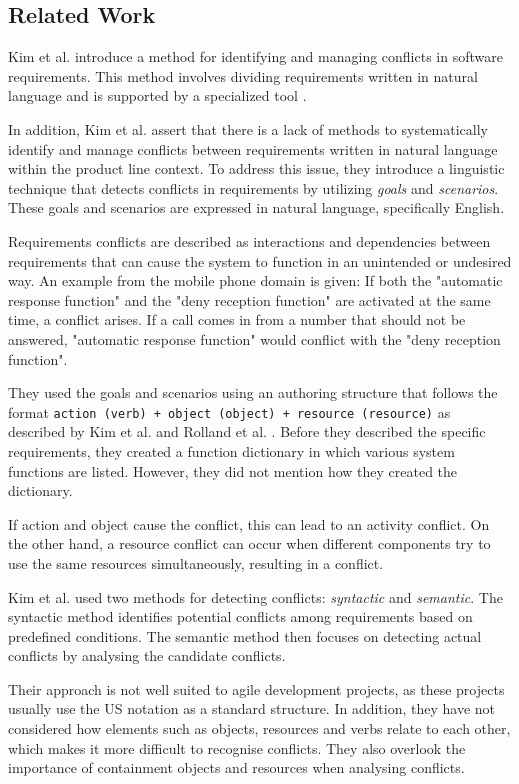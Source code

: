 \subsection{Related Work}\label{conflict_related_work}
Kim et al. introduce a method for identifying and managing conflicts in software requirements. This method involves dividing requirements written in natural language and is supported by a specialized tool \cite{kim2007managing}.

In addition, Kim et al. assert that there is a lack of methods to systematically identify and manage conflicts between requirements written in natural language within the product line context. To address this issue, they introduce a linguistic technique that detects conflicts in requirements by utilizing \textit{goals} and \textit{scenarios}. These goals and scenarios are expressed in natural language, specifically English.

Requirements conflicts are described as interactions and dependencies between requirements that can cause the system to function in an unintended or undesired way. An example from the mobile phone domain is given: If both the "automatic response function" and the "deny reception function" are activated at the same time, a conflict arises. If a call comes in from a number that should not be answered, "automatic response function" would conflict with the "deny reception function".

They used the goals and scenarios using an authoring structure that follows the format \texttt{action (verb) + object (object) + resource (resource)} as described by Kim et al. \cite{kim2004method,kim2004multi} and Rolland et al. \cite{rolland1998guiding}. Before they described the specific requirements, they created a function dictionary in which various system functions are listed. However, they did not mention how they created the dictionary.

If action and object cause the conflict, this can lead to an activity conflict. On the other hand, a resource conflict can occur when different components try to use the same resources simultaneously, resulting in a conflict.

Kim et al. used two methods for detecting conflicts: \textit{syntactic} and \textit{semantic}. The syntactic method identifies potential conflicts among requirements based on predefined conditions. The semantic method then focuses on detecting actual conflicts by analysing the candidate conflicts.

Their approach is not well suited to agile development projects, as these projects usually use the US notation as a standard structure. In addition, they have not considered how elements such as objects, resources and verbs relate to each other, which makes it more difficult to recognise conflicts. They also overlook the importance of containment objects and resources when analysing conflicts.


